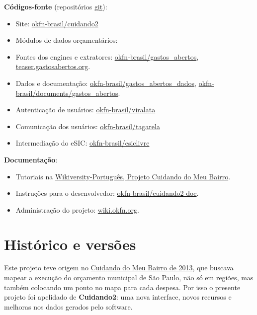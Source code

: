 \documentclass[letterpaper,10pt,portuges]{sphinxmanual}
\begin{document}
\textbf{Códigos-fonte} (repositórios \href{https://pt.wikipedia.org/wiki/Git}{git}):
\begin{itemize}
\item {} 
Site:
\href{https://github.com/okfn-brasil/cuidando2}{okfn-brasil/cuidando2}

\item {} 
Módulos de dados orçamentários:

\item {} 
Fontes dos engines e extratores:
\href{https://github.com/okfn-brasil/gastos\_abertos}{okfn-brasil/gastos\_abertos},
\href{https://github.com/okfn-brasil/teaser.gastosabertos.org}{teaser.gastosabertos.org}.

\item {} 
Dados e documentação:
\href{https://github.com/okfn-brasil/gastos\_abertos\_dados}{okfn-brasil/gastos\_abertos\_dados},
\href{https://github.com/okfn-brasil/documents/blob/master/gastos\_abertos}{okfn-brasil/documents/gastos\_abertos}.

\item {} 
Autenticação de usuários:
\href{https://github.com/okfn-brasil/viralata}{okfn-brasil/viralata}

\item {} 
Comunicação dos usuários:
\href{https://github.com/okfn-brasil/tagarela}{okfn-brasil/tagarela}

\item {} 
Intermediação do eSIC:
\href{https://github.com/okfn-brasil/esiclivre}{okfn-brasil/esiclivre}

\end{itemize}

\textbf{Documentação}:
\begin{itemize}
\item {} 
Tutoriais na \href{https://pt.wikiversity.org/wiki/Projeto\_Cuidando\_do\_Meu\_Bairro}{Wikiversity-Português, Projeto Cuidando do Meu
Bairro}.

\item {} 
Instruções para o desenvolvedor:
\href{https://github.com/okfn-brasil/cuidando2-doc}{okfn-brasil/cuidando2-doc}.

\item {} 
Administração do projeto:
\href{http://wiki.okfn.org/Open\_Knowledge\_Brasil/Gastos\_Abertos}{wiki.okfn.org}.

\end{itemize}


\chapter{Histórico e versões}
\label{index:historico-e-versoes}
Este projeto teve origem no \href{http://cuidando.org.br}{Cuidando do Meu Bairro de
2013}, que buscava mapear a execução do
orçamento municipal de São Paulo, não só em regiões, mas também
colocando um ponto no mapa para cada despesa. Por isso o presente
projeto foi apelidado de \textbf{Cuidando2}: uma nova interface, novos
recursos e melhoras nos dados gerados pelo software.
\end{document}
